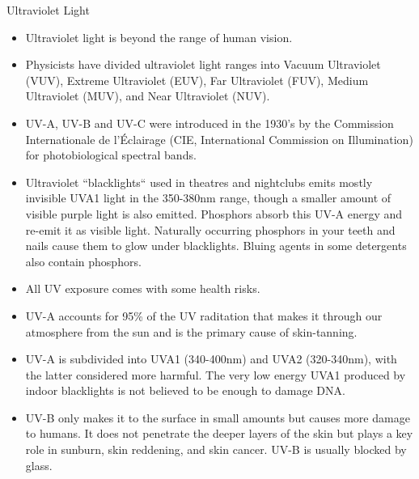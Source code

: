 {\Large Ultraviolet Light}
\begin{itemize}
\item Ultraviolet light is beyond the range of human vision.

\item Physicists have divided ultraviolet light ranges into Vacuum Ultraviolet (VUV), Extreme Ultraviolet (EUV), Far Ultraviolet (FUV), Medium Ultraviolet (MUV), and Near Ultraviolet (NUV).

\item UV-A, UV-B and UV-C were introduced in the 1930's by the Commission Internationale de l'\'{E}clairage (CIE, International Commission on Illumination) for photobiological spectral bands.

\item Ultraviolet ``blacklights`` used in theatres and nightclubs emits mostly invisible UVA1 light in the 350-380nm range, though a smaller amount of visible purple light is also emitted. Phosphors absorb this UV-A energy and re-emit it as visible light. Naturally occurring phosphors in your teeth and nails cause them to glow under blacklights. Bluing agents in some detergents also contain phosphors. %


\item All UV exposure comes with some health risks.

\item UV-A accounts for 95\% of the UV raditation that makes it through our atmosphere from the sun and is the primary cause of skin-tanning.

\item UV-A is subdivided into UVA1 (340-400nm) and UVA2 (320-340nm), with the latter considered more harmful. The very low energy UVA1 produced by indoor blacklights is not believed to be enough to damage DNA.

\item UV-B only makes it to the surface in small amounts but causes more damage to humans. It does not penetrate the deeper layers of the skin but plays a key role in sunburn, skin reddening, and skin cancer. UV-B is usually blocked by glass.


\end{itemize}
